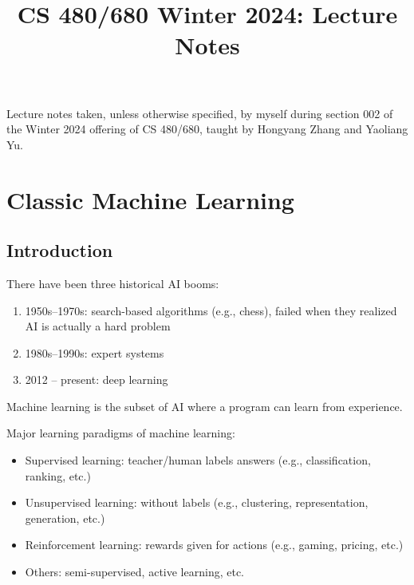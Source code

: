 \documentclass[class=cs480,notes,tikz]{agony}
\title{CS 480/680 Winter 2024: Lecture Notes}
\begin{document}
\renewcommand{\contentsname}{CS 480/680 Winter 2024:\\{\huge Lecture Notes}}
\thispagestyle{firstpage}
\tableofcontents

Lecture notes taken, unless otherwise specified,
by myself during section 002 of the Winter 2024 offering of CS 480/680,
taught by Hongyang Zhang and Yaoliang Yu.

\begin{multicols}{2}
  \listoflecture
\end{multicols}

\chapter{Classic Machine Learning}

\section{Introduction}

There have been three historical AI booms:
\begin{enumerate}[1.,nosep]
  \item 1950s--1970s: search-based algorithms (e.g., chess),
        failed when they realized AI is actually a hard problem
  \item 1980s--1990s: expert systems
  \item 2012 -- present: deep learning
\end{enumerate}

Machine learning is the subset of AI where a program can learn from experience.

Major learning paradigms of machine learning:
\begin{itemize}[nosep]
  \item Supervised learning: teacher/human labels answers (e.g., classification, ranking, etc.)
  \item Unsupervised learning: without labels (e.g., clustering, representation, generation, etc.)
  \item Reinforcement learning: rewards given for actions (e.g., gaming, pricing, etc.)
  \item Others: semi-supervised, active learning, etc.
\end{itemize}
\end{document}
